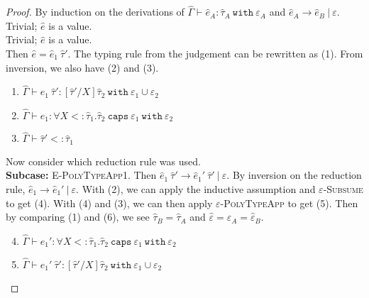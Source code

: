 \documentclass{llncs}
\newcommand{\keywadj}[1]{\mathtt{#1}}
\newcommand{\keyw}[1]{\keywadj{#1}~}
\newcommand{\kw}[1]{\keyw{ #1 }}
\begin{document}
\begin{proof} By induction on the derivations of $\hat \Gamma \vdash \hat e_A: \hat \tau_A~\kw{with} \varepsilon_A$ and $\hat e_A \longrightarrow \hat e_B~|~\varepsilon$.\\

 Trivial; $\hat e$ is a value.\\

 Trivial; $\hat e$ is a value.\\

 Then $\hat e = \hat e_1~\hat \tau'$. The typing rule from the judgement can be rewritten as (1). From inversion, we also have (2) and (3).

\begin{enumerate}
	\item$ \hat \Gamma \vdash \hat e_1~\hat \tau': [\hat \tau'/X]\hat \tau_2 ~\kw{with} \varepsilon_1 \cup \varepsilon_2$
	\item $\hat \Gamma \vdash \hat e_1: \forall X <: \hat \tau_1. \hat \tau_2~\kw{caps} \varepsilon_1 ~\kw{with} \varepsilon_2$
	\item $\hat \Gamma \vdash \hat \tau' <: \hat \tau_1$
\end{enumerate}

 Now consider which reduction rule was used.\\

\textbf{Subcase:} \textsc{E-PolyTypeApp1}. Then $\hat e_1~\hat \tau' \longrightarrow \hat e_1'~\hat \tau'~|~\varepsilon$. By inversion on the reduction rule, $\hat e_1 \longrightarrow \hat e_1'~|~\varepsilon$. With (2), we can apply the inductive assumption and \textsc{$\varepsilon$-Subsume} to get (4). With (4) and (3), we can then apply \textsc{$\varepsilon$-PolyTypeApp} to get (5). Then by comparing (1) and (6), we see $\hat \tau_B = \hat \tau_A$ and $\hat \varepsilon = \hat \varepsilon_A = \hat \varepsilon_B$.

\begin{enumerate}
	\setcounter{enumi}{3}
	\item $\hat \Gamma \vdash \hat e_1': \forall X <: \hat \tau_1. \hat \tau_2~\kw{caps} \varepsilon_1~\kw{with} \varepsilon_2$
	\item $\hat \Gamma \vdash \hat e_1'~\hat \tau': [\hat \tau'/X]\hat \tau_2~\kw{with} \varepsilon_1 \cup \varepsilon_2$
\end{enumerate}


\end{proof}
\end{document}
